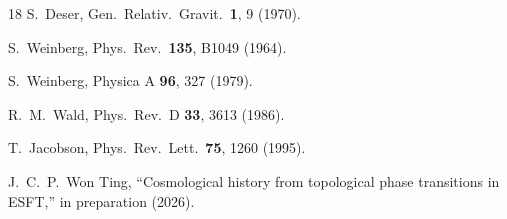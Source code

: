 ﻿\documentclass[twocolumn,preprintnumbers,amsmath,amssymb,prd]{revtex4-2}
\begin{document}
\begin{thebibliography}{18}
 S.~Deser, Gen.\ Relativ.\ Gravit.\ \textbf{1}, 9 (1970).

 S.~Weinberg, Phys.\ Rev.\ \textbf{135}, B1049 (1964).

 S.~Weinberg, Physica A \textbf{96}, 327 (1979).

 R.~M.~Wald, Phys.\ Rev.\ D \textbf{33}, 3613 (1986).

 T.~Jacobson, Phys.\ Rev.\ Lett.\ \textbf{75}, 1260 (1995).

 J.~C.~P.~Won Ting, ``Cosmological history from topological phase transitions in ESFT,'' in preparation (2026).

\end{thebibliography}
\end{document}
